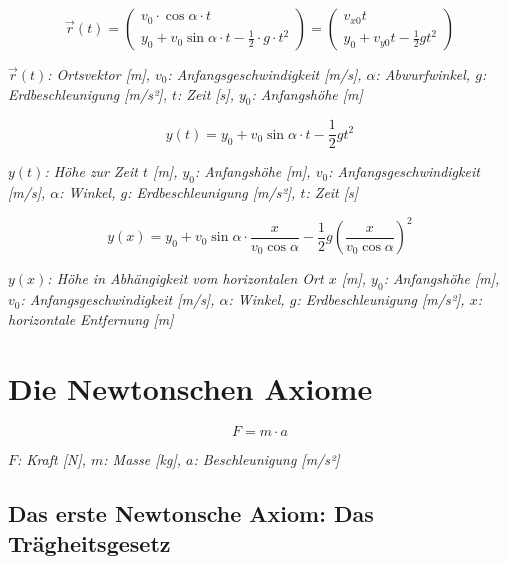 \documentclass[a4paper,10pt]{article}
\newenvironment{displayformula}
{
	\begin{framed}
		\color{formulaColor}
	}
	{\end{framed}}
\newcommand{\formulalegend}[1]{%
	\par\vspace{0.5ex}%
	{{\color{legendColor}\RaggedRight\small\textit{#1}}}%
	\par\vspace{1.5ex}%
}
\begin{document}
\begin{displayformula}
	\[
	\vec{r}(t) =
	\begin{pmatrix}
		v_0 \cdot \cos\alpha \cdot t\\
		y_0 + v_0\sin\alpha \cdot t - \frac{1}{2} \cdot g \cdot t^2
	\end{pmatrix}
	=
	\begin{pmatrix}
		v_{x0} t\\
		y_0 + v_{y0} t - \frac{1}{2} g t^2
	\end{pmatrix}
	\]
\end{displayformula}
\formulalegend{
	\( \vec{r}(t) \): Ortsvektor [m], \( v_0 \): Anfangsgeschwindigkeit [m/s], \( \alpha \): Abwurfwinkel, \( g \): Erdbeschleunigung [m/s²], \( t \): Zeit [s], \( y_0 \): Anfangshöhe [m]
}

\begin{displayformula}
	\[
	y(t) = y_0 + v_0\sin\alpha \cdot t - \frac{1}{2} gt^2
	\]
\end{displayformula}
\formulalegend{
	\( y(t) \): Höhe zur Zeit \( t \) [m], \( y_0 \): Anfangshöhe [m], \( v_0 \): Anfangsgeschwindigkeit [m/s], \( \alpha \): Winkel, \( g \): Erdbeschleunigung [m/s²], \( t \): Zeit [s]
}

\begin{displayformula}
	\[
	y(x) = y_0 + v_0\sin\alpha \cdot \frac{x}{v_0 \cos\alpha} - \frac{1}{2} g \left(\frac{x}{v_0\cos\alpha}\right)^2
	\]
\end{displayformula}
\formulalegend{
	\( y(x) \): Höhe in Abhängigkeit vom horizontalen Ort \( x \) [m], \( y_0 \): Anfangshöhe [m], \( v_0 \): Anfangsgeschwindigkeit [m/s], \( \alpha \): Winkel, \( g \): Erdbeschleunigung [m/s²], \( x \): horizontale Entfernung [m]
}



\section{Die Newtonschen Axiome}

\begin{displayformula}
	\[
	F = m \cdot a
	\]
\end{displayformula}
\formulalegend{
	\( F \): Kraft [N], \( m \): Masse [kg], \( a \): Beschleunigung [m/s²]
}

\subsection{Das erste Newtonsche Axiom: Das Trägheitsgesetz}
\end{document}
